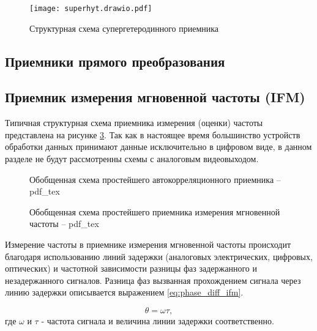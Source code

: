 \begin{figure}[ht]
	\centering
	\texttt{[image: superhyt.drawio.pdf]}	
	\caption{Структурная схема супергетеродинного приемника}
	\label{ct:superhyt}
\end{figure}

\subsection{Приемники прямого преобразования}

\subsection{Приемник измерения мгновенной частоты (IFM)}

Типичная структурная схема приемника измерения (оценки) частоты представлена на рисунке \ref{ct:ifm_struct_simple}. Так как в настоящее время большинство устройств обработки данных принимают данные исключительно в цифровом виде, в данном разделе не будут рассмотренны схемы с аналоговым видеовыходом.

\begin{figure}[ht]
	\centering
	\resizebox{\linewidth}{!}{}
	
	\caption{Обобщенная схема простейшего автокорреляционного приемника -- pdf\_tex}
	\label{ct:autocorr_struct_simple}
\end{figure}

\begin{figure}[ht]
	\centering
	\resizebox{\linewidth}{!}{}
	
	\caption{Обобщенная схема простейшего приемника измерения мгновенной частоты -- pdf\_tex}
	\label{ct:ifm_struct_simple}
\end{figure}

Измерение частоты в приемнике измерения мгновенной частоты происходит благодаря использованию линий задержки (аналоговых электрических, цифровых, оптических) и частотной зависимости разницы фаз задержанного и незадержанного сигналов. Разница фаз вызванная прохождением сигнала через линию задержки описывается выражением \eqref{eq:phase_diff_ifm}.

\begin{equation}
	\theta = \omega \tau ,
	\label{eq:phase_diff_ifm}
\end{equation}
где \(\omega\) и \(\tau\) - частота сигнала и величина линии задержки соответственно.

